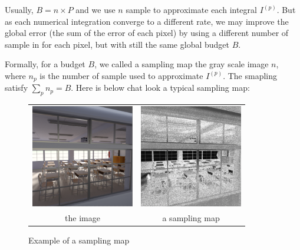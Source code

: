 \documentclass{classeENS}
\begin{document}
\par Usually, $B=n\times P$ and we use $n$ sample to approximate each integral $I^{(p)}$.
But as each numerical integration converge to a different rate, we may improve the global error
(the sum of the error of each pixel) by using a different number of sample in for each pixel,
but with still the same global budget $B$.
\par Formally, for a budget $B$, we called a sampling map the gray scale image $n$, 
where $n_p$ is the number of sample used to approximate $I^{(p)}$. The smapling 
satisfy $\sum_{p} n_p = B$. Here is below chat look a typical sampling map:

\begin{figure}[H]
    \centering
    \caption{Example of a sampling map}
    \begin{tabular}{cc}
    \includegraphics[width=45mm]{image/without/gt.png}
    & \includegraphics[width=45mm]{image/without/sm.png}\\
    the image & a sampling map
    \end{tabular}
\end{figure}
\end{document}
